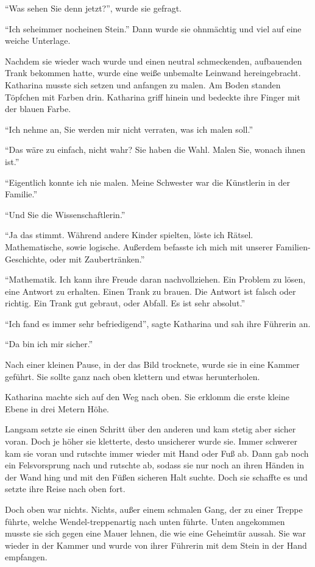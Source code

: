 \enquote{Was sehen Sie denn jetzt?}, wurde sie gefragt.

\enquote{Ich sehe\abs immer noch\abs einen Stein.} Dann wurde sie ohnmächtig und viel auf eine weiche Unterlage.

Nachdem sie wieder wach wurde und einen neutral schmeckenden, aufbauenden Trank bekommen hatte, wurde eine weiße unbemalte Leinwand hereingebracht. Katharina musste sich setzen und anfangen zu malen. Am Boden standen Töpfchen mit Farben drin. Katharina griff hinein und bedeckte ihre Finger mit der blauen Farbe.

\enquote{Ich nehme an, Sie werden mir nicht verraten, was ich malen soll.}

\enquote{Das wäre zu einfach, nicht wahr? \gst Sie haben die Wahl. Malen Sie, wonach ihnen ist.}

\enquote{Eigentlich konnte ich nie malen. Meine Schwester war die Künstlerin in der Familie.}

\enquote{Und Sie die Wissenschaftlerin.}

\enquote{Ja das stimmt. Während andere Kinder spielten, löste ich Rätsel. Mathematische, sowie logische. Außerdem befasste ich mich mit unserer Familien-Geschichte, oder mit Zaubertränken.}

\enquote{Mathematik. Ich kann ihre Freude daran nachvollziehen. Ein Problem zu lösen, eine Antwort zu erhalten. Einen Trank zu brauen. Die Antwort ist falsch oder richtig. Ein Trank gut gebraut, oder Abfall. Es ist sehr absolut.}

\enquote{Ich fand es immer sehr befriedigend}, sagte Katharina und sah ihre Führerin an.

\enquote{Da bin ich mir sicher.}

Nach einer kleinen Pause, in der das Bild trocknete, wurde sie in eine Kammer geführt. Sie sollte ganz nach oben klettern und etwas herunterholen.

Katharina machte sich auf den Weg nach oben. Sie erklomm die erste kleine Ebene in drei Metern Höhe.

Langsam setzte sie einen Schritt über den anderen und kam stetig aber sicher voran. Doch je höher sie kletterte, desto unsicherer wurde sie. Immer schwerer kam sie voran und rutschte immer wieder mit Hand oder Fuß ab. Dann gab noch ein Felsvorsprung nach und rutschte ab, sodass sie nur noch an ihren Händen in der Wand hing und mit den Füßen sicheren Halt suchte. Doch sie schaffte es und setzte ihre Reise nach oben fort.

Doch oben war nichts. Nichts, außer einem schmalen Gang, der zu einer Treppe führte, welche Wendel-treppenartig nach unten führte. Unten angekommen musste sie sich gegen eine Mauer lehnen, die wie eine Geheimtür aussah. Sie war wieder in der Kammer und wurde von ihrer Führerin mit dem Stein in der Hand empfangen.

